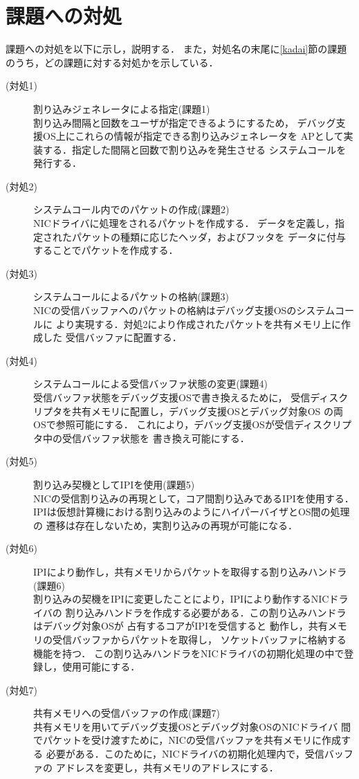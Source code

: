 \documentclass[tanilab-enum]{graduate}
\begin{document}
\section{課題への対処}\label{taisyo}
課題への対処を以下に示し，説明する．
また，対処名の末尾に\ref{kadai}節の課題のうち，どの課題に対する対処かを示している．
\begin{description}
    \item[(対処1)]割り込みジェネレータによる指定(課題1)\\
        割り込み間隔と回数をユーザが指定できるようにするため，
        デバッグ支援OS上にこれらの情報が指定できる割り込みジェネレータを
        APとして実装する．指定した間隔と回数で割り込みを発生させる
        システムコールを発行する．
    \item[(対処2)]システムコール内でのパケットの作成(課題2)\\
        NICドライバに処理をされるパケットを作成する．
        データを定義し，指定されたパケットの種類に応じたヘッダ，およびフッタを
        データに付与することでパケットを作成する．
    \item[(対処3)]システムコールによるパケットの格納(課題3)\\
        NICの受信バッファへのパケットの格納はデバッグ支援OSのシステムコールに
        より実現する．対処2により作成されたパケットを共有メモリ上に作成した
        受信バッファに配置する．
    \item[(対処4)]システムコールによる受信バッファ状態の変更(課題4)\\
        受信バッファ状態をデバッグ支援OSで書き換えるために，
        受信ディスクリプタを共有メモリに配置し，デバッグ支援OSとデバッグ対象OS
        の両OSで参照可能にする．
        これにより，デバッグ支援OSが受信ディスクリプタ中の受信バッファ状態を
        書き換え可能にする．
    \item[(対処5)]割り込み契機としてIPIを使用(課題5)\\
        NICの受信割り込みの再現として，コア間割り込みであるIPIを使用する．
        IPIは仮想計算機における割り込みのようにハイパーバイザとOS間の処理の
        遷移は存在しないため，実割り込みの再現が可能になる．
    \item[(対処6)]IPIにより動作し，共有メモリからパケットを取得する割り込みハンドラ(課題6)\\
        割り込みの契機をIPIに変更したことにより，IPIにより動作するNICドライバの
        割り込みハンドラを作成する必要がある．この割り込みハンドラはデバッグ対象OSが
        占有するコアがIPIを受信すると
        動作し，共有メモリの受信バッファからパケットを取得し，
        ソケットバッファに格納する機能を持つ．
        この割り込みハンドラをNICドライバの初期化処理の中で登録し，使用可能にする．
    \item[(対処7)]共有メモリへの受信バッファの作成(課題7)\\
        共有メモリを用いてデバッグ支援OSとデバッグ対象OSのNICドライバ
        間でパケットを受け渡すために，NICの受信バッファを共有メモリに作成する
        必要がある．このために，NICドライバの初期化処理内で，受信バッファの
        アドレスを変更し，共有メモリのアドレスにする．

\end{description}
\end{document}
